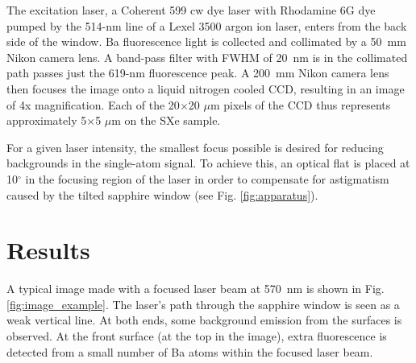 \documentclass[aps,pra,reprint,superscriptaddress]{revtex4-1}
\begin{document}
The excitation laser, a Coherent 599 cw dye laser with Rhodamine 6G dye pumped by the 514-nm line of a Lexel 3500 argon ion laser, enters from the back side of the window.  Ba fluorescence light is collected and collimated by a 50~mm Nikon camera lens.  A band-pass filter with FWHM of 20~nm is in the collimated path passes just the 619-nm fluorescence peak.  A 200~mm Nikon camera lens then focuses the image onto a liquid nitrogen cooled CCD, resulting in an image of 4x magnification.  Each of the 20$\times$20 $\mu$m pixels of the CCD thus represents approximately 5$\times$5 $\mu$m on the SXe sample.

For a given laser intensity, the smallest focus possible is desired for reducing backgrounds in the single-atom signal.  To achieve this, an optical flat is placed at 10$^{\circ}$ in the focusing region of the laser in order to compensate for astigmatism caused by the tilted sapphire window (see Fig. \ref{fig:apparatus}).

\section{Results}
\label{sec:results}



A typical image made with a focused laser beam at 570~nm is shown in Fig. \ref{fig:image_example}.  The laser's path through the sapphire window is seen as a weak vertical line.  At both ends, some background emission from the surfaces is observed.  At the front surface (at the top in the image), extra fluorescence is detected from a small number of Ba atoms within the focused laser beam.
\end{document}
